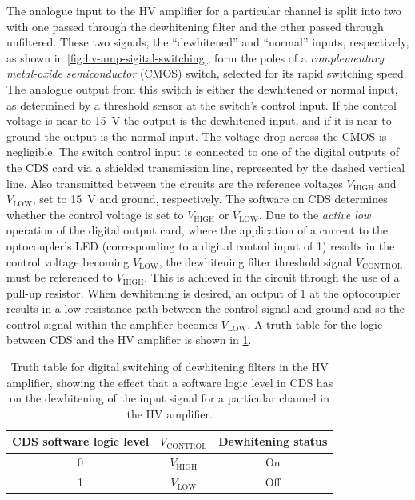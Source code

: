 The analogue input to the \gls{HV} amplifier for a particular channel is split into two with one passed through the dewhitening filter and the other passed through unfiltered. These two signals, the ``dewhitened'' and ``normal'' inputs, respectively, as shown in \cref{fig:hv-amp-sigital-switching}, form the poles of a \emph{complementary metal-oxide semiconductor} (\gls{CMOS}) switch, selected for its rapid switching speed. The analogue output from this switch is either the dewhitened or normal input, as determined by a threshold sensor at the switch's control input. If the control voltage is near to \SI{15}{\volt} the output is the dewhitened input, and if it is near to ground the output is the normal input. The voltage drop across the \gls{CMOS} is negligible. The switch control input is connected to one of the digital outputs of the \gls{CDS} card via a shielded transmission line, represented by the dashed vertical line. Also transmitted between the circuits are the reference voltages $V_{\text{HIGH}}$ and $V_{\text{LOW}}$, set to \SI{15}{\volt} and ground, respectively. The software on \gls{CDS} determines whether the control voltage is set to $V_{\text{HIGH}}$ or $V_{\text{LOW}}$. Due to the \emph{active low} operation of the digital output card, where the application of a current to the optocoupler's \gls{LED} (corresponding to a digital control input of \num{1}) results in the control voltage becoming $V_{\text{LOW}}$, the dewhitening filter threshold signal $V_{\text{CONTROL}}$ must be referenced to $V_{\text{HIGH}}$. This is achieved in the circuit through the use of a pull-up resistor. When dewhitening is desired, an output of \num{1} at the optocoupler results in a low-resistance path between the control signal and ground and so the control signal within the amplifier becomes $V_{\text{LOW}}$. A truth table for the logic between \gls{CDS} and the \gls{HV} amplifier is shown in \cref{tab:digital-dewhitening-truth-table}.

\begin{table}
  \centering
  {\renewcommand{\arraystretch}{1.2} %
    \begin{tabular}{c|c|c}
      \textbf{\gls{CDS} software logic level} & \textbf{$V_{\text{CONTROL}}$} & \textbf{Dewhitening status} \\
      \hline
      0 & $V_{\text{HIGH}}$ & On \\
      1 & $V_{\text{LOW}}$ & Off
    \end{tabular}
  }
  \caption[Truth table for digital switching of dewhitening filters in the high voltage amplifier]{\label{tab:digital-dewhitening-truth-table}Truth table for digital switching of dewhitening filters in the \gls{HV} amplifier, showing the effect that a software logic level in \gls{CDS} has on the dewhitening of the input signal for a particular channel in the \gls{HV} amplifier.}
\end{table}

